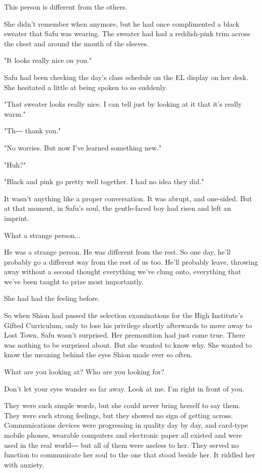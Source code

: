 This person is different from the others.

She didn't remember when anymore, but he had once complimented a black
sweater that Safu was wearing. The sweater had had a reddish-pink trim
across the chest and around the mouth of the sleeves.

"It looks really nice on you."

Safu had been checking the day's class schedule on the EL display on her
desk. She hesitated a little at being spoken to so suddenly.

"That sweater looks really nice. I can tell just by looking at it that
it's really warm."

"Th― thank you."

"No worries. But now I've learned something new."

"Huh?"

"Black and pink go pretty well together. I had no idea they did."

It wasn't anything like a proper conversation. It was abrupt, and
one-sided. But at that moment, in Safu's soul, the gentle-faced boy had
risen and left an imprint.

What a strange person...

He was a strange person. He was different from the rest. So one day,
he'll probably go a different way from the rest of us too. He'll
probably leave, throwing away without a second thought everything we've
clung onto, everything that we've been taught to prize most importantly.

She had had the feeling before.

So when Shion had passed the selection examinations for the High
Institute's Gifted Curriculum, only to lose his privilege shortly
afterwards to move away to Lost Town, Safu wasn't surprised. Her
premonition had just come true. There was nothing to be surprised about.
But she wanted to know why. She wanted to know the meaning behind the
eyes Shion made ever so often.

What are you looking at? Who are you looking for?

Don't let your eyes wander so far away. Look at me. I'm right in front
of you.

They were such simple words, but she could never bring herself to say
them. They were such strong feelings, but they showed no sign of getting
across. Communications devices were progressing in quality day by day,
and card-type mobile phones, wearable computers and electronic paper all
existed and were used in the real world― but all of them were useless to
her. They served no function to communicate her soul to the one that
stood beside her. It riddled her with anxiety.

